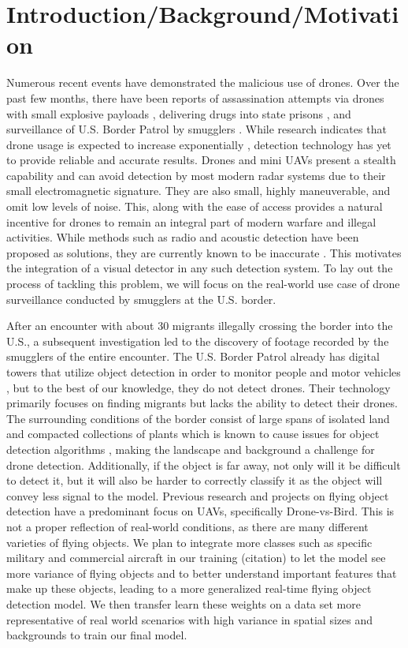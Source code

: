 \documentclass[10pt,twocolumn,letterpaper]{article}
\begin{document}
\section{Introduction/Background/Motivation}
Numerous recent events have demonstrated the malicious use of drones. Over the past few months, there have been reports of assassination attempts via drones with small explosive payloads \cite{SuicideDrone}, delivering drugs into state prisons \cite{PrisonDrugs}, and surveillance of U.S. Border Patrol by smugglers \cite{BorderPatrol}. While research indicates that drone usage is expected to increase exponentially \cite{DroneMarket}, detection technology has yet to provide reliable and accurate results. Drones and mini UAVs present a stealth capability and can avoid detection by most modern radar systems due to their small electromagnetic signature. They are also small, highly maneuverable, and omit low levels of noise. This, along with the ease of access provides a natural incentive for drones to remain an integral part of modern warfare and illegal activities. While methods such as radio and acoustic detection have been proposed as solutions, they are currently known to be inaccurate \cite{Drone-Detection-Using-YOLOv5}. This motivates the integration of a visual detector in any such detection system. To lay out the process of tackling this problem, we will focus on the real-world use case of drone surveillance conducted by smugglers at the U.S. border.

After an encounter with about 30 migrants illegally crossing the border into the U.S., a subsequent investigation led to the discovery of footage recorded by the smugglers of the entire encounter. The U.S. Border Patrol already has digital towers that utilize object detection in order to monitor people and motor vehicles \cite{BorderDetection}, but to the best of our knowledge, they do not detect drones. Their technology primarily focuses on finding migrants but lacks the ability to detect their drones. The surrounding conditions of the border consist of large spans of isolated land and compacted collections of plants which is known to cause issues for object detection algorithms \cite{BorderDigitalTowers}, making the landscape and background a challenge for drone detection. Additionally, if the object is far away, not only will it be difficult to detect it, but it will also be harder to correctly classify it as the object will convey less signal to the model. Previous research and projects on flying object detection have a predominant focus on UAVs, specifically Drone-vs-Bird. This is not a proper reflection of real-world conditions, as there are many different varieties of flying objects. We plan to integrate more classes such as specific military and commercial aircraft in our training (citation) to let the model see more variance of flying objects and to better understand important features that make up these objects, leading to a more generalized real-time flying object detection model. We then transfer learn these weights on a data set more representative of real world scenarios with high variance in spatial sizes and backgrounds to train our final model.  
\end{document}
